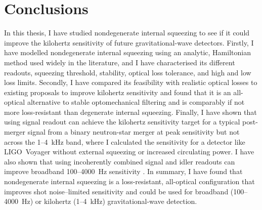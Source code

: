 \chapter{Conclusions}
\label{chp:future_work_and_conclusions}

In this thesis, I have studied nondegenerate internal squeezing to see if it could improve the kilohertz sensitivity of future gravitational-wave detectors.
Firstly, I have modelled nondegenerate internal squeezing using an analytic, Hamiltonian method used widely in the literature, and I have characterised its different readouts, squeezing threshold, stability, optical loss tolerance, and high and low loss limits.  Secondly, I have compared its feasibility with realistic optical losses to existing proposals to improve kilohertz sensitivity and found that it is an all-optical alternative to stable optomechanical filtering and is comparably if not more loss-resistant than degenerate internal squeezing. Finally, I have shown that using signal readout can achieve the kilohertz sensitivity target for a typical post-merger signal from a binary neutron-star merger at peak sensitivity but not across the 1--4~kHz band, where I calculated the sensitivity for a detector like LIGO~Voyager without external squeezing or increased circulating power. I have also shown that using incoherently combined signal and idler readouts can improve broadband 100--4000~Hz  sensitivity .
In summary, I have found that nondegenerate internal squeezing is a loss-resistant, all-optical configuration that improves shot noise--limited sensitivity and could be used for broadband (100--4000~Hz) or kilohertz (1--4~kHz) gravitational-wave detection.

